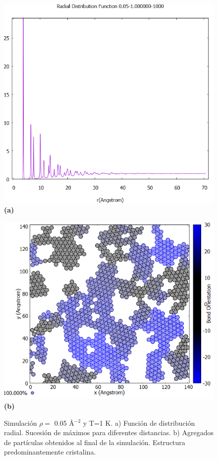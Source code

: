 \begin{figure}[H]
	\centering
	\begin{minipage}[b]{0.47\textwidth}
		\centering
		\includegraphics[width=1\textwidth]{grafico_3x12_0.05_1_rdf.png}
		\textbf{(a)}
	\end{minipage}%
	\hfill
	\begin{minipage}[b]{0.5\textwidth}
		\centering
		\includegraphics[width=1\textwidth]{grafico_3x13_0.05_1_dinamica.png}
		\textbf{(b)}
	\end{minipage}
	
	\caption{\footnotesize Simulación  $\rho=$ 0.05 \AA$^{-2}$ y  T=1 K. a) Función de distribución radial. Sucesión de máximos para diferentes distancias. b) Agregados de  partículas  obtenidos al final de la simulación. Estructura predominantemente cristalina.}
	\label{fig:0.05t1}
\end{figure}


